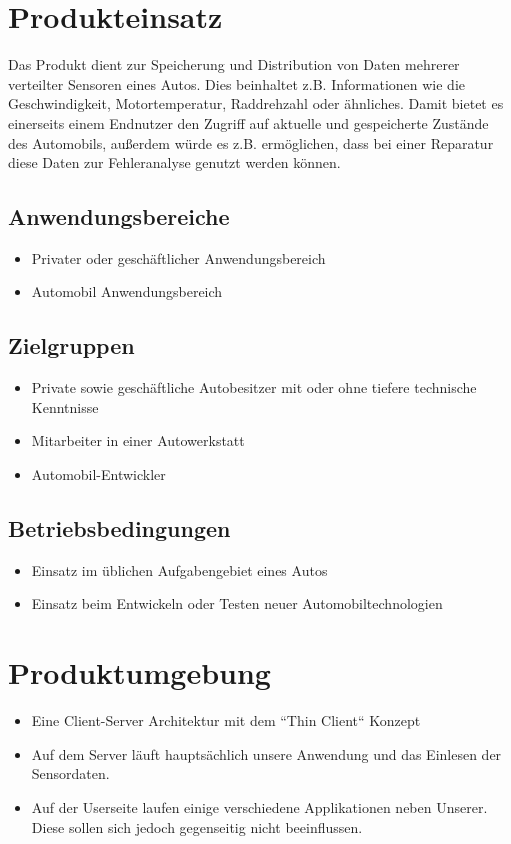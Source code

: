 \documentclass[pflichtenheft.tex]{subfiles}
\begin{document}
\chapter{Produkteinsatz}
Das Produkt dient zur Speicherung und Distribution von Daten mehrerer verteilter Sensoren eines Autos. Dies beinhaltet z.B. Informationen wie die Geschwindigkeit, Motortemperatur, Raddrehzahl oder ähnliches. Damit bietet es einerseits einem Endnutzer den Zugriff auf aktuelle und gespeicherte Zustände des Automobils, außerdem würde es z.B. ermöglichen, dass bei einer Reparatur diese Daten zur Fehleranalyse genutzt werden können.


\section{Anwendungsbereiche}
\begin{itemize}
\item
Privater oder geschäftlicher Anwendungsbereich
\item
Automobil Anwendungsbereich
\end{itemize}


\section{Zielgruppen}
\begin{itemize}
\item
Private sowie geschäftliche Autobesitzer mit oder ohne tiefere technische Kenntnisse
\item
Mitarbeiter in einer Autowerkstatt
\item
Automobil-Entwickler
\end{itemize}


\section{Betriebsbedingungen}
\begin{itemize}
\item
Einsatz im üblichen Aufgabengebiet eines Autos
\item
Einsatz beim Entwickeln oder Testen neuer Automobiltechnologien
\end{itemize}


\chapter{Produktumgebung}
\begin{itemize}
\item
Eine Client-Server Architektur mit dem ``Thin Client`` Konzept
\item
Auf dem Server läuft hauptsächlich unsere Anwendung und das Einlesen der Sensordaten.
\item
Auf der Userseite laufen einige verschiedene Applikationen neben Unserer. Diese sollen sich jedoch gegenseitig nicht beeinflussen.
\end{itemize}
\end{document}
